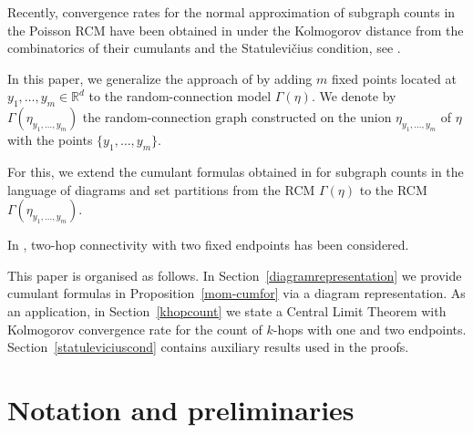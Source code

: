 \documentclass[12pt]{article}
\newcommand{\R}{\mathbb{R}}
\numberwithin{equation}{section}
\begin{document}

\medskip 

Recently, convergence rates for the normal approximation of subgraph
counts in the Poisson RCM
 have been obtained in \cite{LiuPrivault} under the Kolmogorov distance 
 from the combinatorics of their cumulants
 and the {Statulevi\v{c}ius condition}, see \cite{rudzkis,doering}. 
 
\medskip 

In this paper, we generalize the approach of \cite{LiuPrivault}
by adding $m$ fixed points located at $y_1 , \ldots,y_m \in \R^d$ 
to the random-connection model $\Gamma(\eta )$.
We denote by $\Gamma(\eta_{y_1, \ldots ,y_m})$ the random-connection
graph constructed on the union $\eta_{y_1, \ldots ,y_m}$ of $\eta$ with the points
$\{ y_1, \ldots ,y_m\}$.
 
\medskip 

 For this, we extend the cumulant formulas obtained in
 \cite{LiuPrivault} for subgraph counts 
 in the language of diagrams and set partitions from the 
 RCM $\Gamma(\eta)$ to the RCM $\Gamma(\eta_{y_1, \ldots ,y_m})$.

\medskip 

In \cite{giles-privault2}, two-hop connectivity with two fixed endpoints
has been considered. 

\medskip 

This paper is organised as follows.
In Section~\ref{diagramrepresentation} we provide cumulant formulas in
Proposition~\ref{mom-cumfor} via a diagram representation.
As an application, in Section~\ref{khopcount} we state a Central Limit Theorem
with Kolmogorov convergence rate for the count of $k$-hops
with one and two endpoints.
 Section~\ref{statuleviciuscond} contains auxiliary results used in the proofs. 

\section{Notation and preliminaries} 
\end{document}
